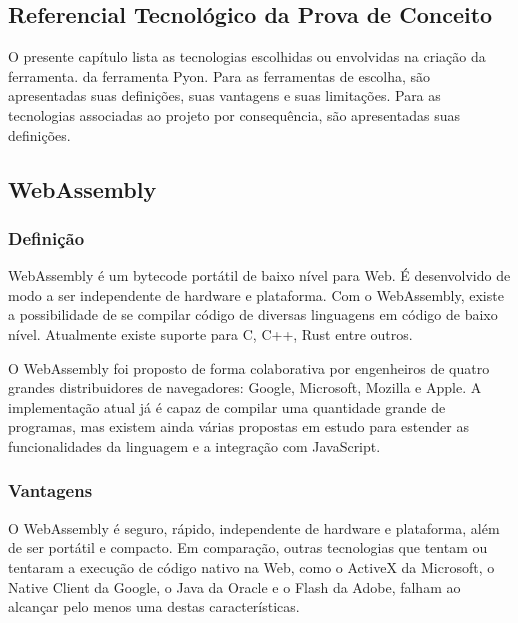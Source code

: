\begin{apendicesenv}

\partapendices

%
%

\chapter[Referencial Tecnológico da Prova de Conceito]{Referencial Tecnológico da Prova de Conceito}
\label{apendice:referencial_tecnologico_poc}

O presente capítulo lista as tecnologias escolhidas ou envolvidas na criação da ferramenta.
da ferramenta Pyon. Para as ferramentas de escolha, são apresentadas suas definições, suas vantagens e 
suas limitações. Para as tecnologias associadas ao projeto por consequência, são apresentadas suas
definições.

\section{WebAssembly}

\subsection{Definição}

WebAssembly é um bytecode portátil de baixo nível para Web. É desenvolvido de modo a ser independente de hardware e plataforma. Com o WebAssembly, existe a possibilidade de se compilar código de diversas linguagens em código de baixo nível. Atualmente existe suporte para C, C++, Rust entre outros.

O WebAssembly foi proposto de forma colaborativa por engenheiros de quatro grandes distribuidores de navegadores: Google, Microsoft, Mozilla e Apple. A implementação atual já é capaz de compilar uma quantidade grande de programas, mas existem ainda várias propostas em estudo para estender as funcionalidades da linguagem e a integração com JavaScript.

\subsection{Vantagens}

O WebAssembly é seguro, rápido, independente de hardware e plataforma, além de ser portátil e compacto. Em comparação, outras tecnologias que tentam ou tentaram a execução de código nativo na Web, como o ActiveX da Microsoft, o Native Client da Google, o Java da Oracle e o Flash da Adobe, falham ao alcançar pelo menos uma destas características.


\end{apendicesenv}
